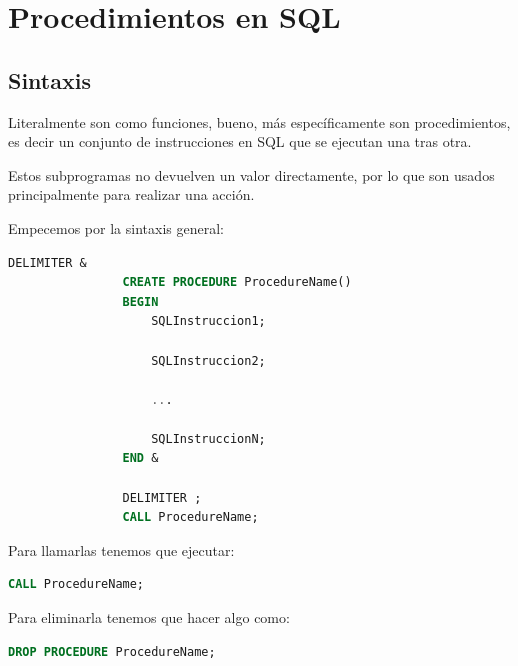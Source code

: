 \documentclass[12pt, fleqn]{report}                             %
\begin{document}
    \clearpage
    \chapter{Procedimientos en SQL}


        \clearpage
        \section{Sintaxis}

            Literalmente son como funciones, bueno, más específicamente son procedimientos,
            es decir un conjunto de instrucciones en SQL que se ejecutan una tras otra.

            Estos subprogramas no devuelven un valor directamente, por lo que son usados
            principalmente para realizar una acción.


            Empecemos por la sintaxis general:

            \begin{lstlisting}[language=SQL, gobble=16]
                DELIMITER &
                CREATE PROCEDURE ProcedureName()
                BEGIN
                    SQLInstruccion1;

                    SQLInstruccion2;

                    ...

                    SQLInstruccionN;
                END &

                DELIMITER ;
                CALL ProcedureName;
            \end{lstlisting}

            Para llamarlas tenemos que ejecutar:
            \begin{lstlisting}[language=SQL, gobble=16]
                CALL ProcedureName;
            \end{lstlisting}

            Para eliminarla tenemos que hacer algo como:
            \begin{lstlisting}[language=SQL, gobble=16]
                DROP PROCEDURE ProcedureName;
            \end{lstlisting}
\end{document}
